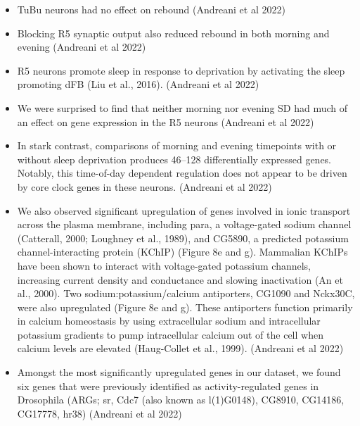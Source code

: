 \documentclass[11pt]{article}
\begin{document}
\begin{itemize}
    \item TuBu neurons had no effect on rebound
    \parencite{andreaniCircadianProgrammingEllipsoid2022} (Andreani et al 2022)

    \item Blocking R5 synaptic output also reduced rebound in both morning and evening
    \parencite{andreaniCircadianProgrammingEllipsoid2022} (Andreani et al 2022)

    \item R5 neurons promote sleep in response to deprivation by activating the sleep promoting dFB (Liu et al., 2016).
    \parencite{andreaniCircadianProgrammingEllipsoid2022} (Andreani et al 2022)

    \item We were surprised to find that neither morning nor evening SD had much of an effect on gene expression in the R5 neurons
    \parencite{andreaniCircadianProgrammingEllipsoid2022} (Andreani et al 2022)

    \item In stark contrast, comparisons of morning and evening timepoints with or without sleep deprivation produces 46–128 differentially expressed genes. Notably, this time-of-day dependent regulation does not appear to be driven by core clock genes in these neurons.
    \parencite{andreaniCircadianProgrammingEllipsoid2022} (Andreani et al 2022)

    \item We also observed significant upregulation of genes involved in ionic transport across the plasma membrane, including para, a voltage-gated sodium channel (Catterall, 2000; Loughney et al., 1989), and CG5890, a predicted potassium channel-interacting protein (KChIP) (Figure 8e and g). Mammalian KChIPs have been shown to interact with voltage-gated potassium channels, increasing current density and conductance and slowing inactivation (An et al., 2000). Two sodium:potassium/calcium antiporters, CG1090 and Nckx30C, were also upregulated (Figure 8e and g). These antiporters function primarily in calcium homeostasis by using extracellular sodium and intracellular potassium gradients to pump intracellular calcium out of the cell when calcium levels are elevated (Haug-Collet et al., 1999).
    \parencite{andreaniCircadianProgrammingEllipsoid2022} (Andreani et al 2022)

    \item Amongst the most significantly upregulated genes in our dataset, we found six genes that were previously identified as activity-regulated genes in Drosophila (ARGs; sr, Cdc7 (also known as l(1)G0148), CG8910, CG14186, CG17778, hr38)
    \parencite{andreaniCircadianProgrammingEllipsoid2022} (Andreani et al 2022)


\end{itemize}
\end{document}
